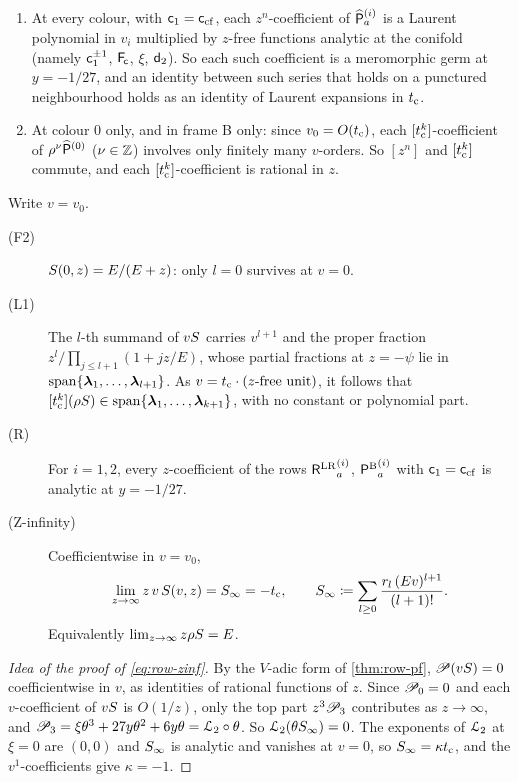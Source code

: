\begin{cor}
\label{cor:row-carry}
\begin{enumerate}
\item At every colour, with $\mathsf{c}_{1}=\mathsf{c}_{\mathrm{cf}}$, each $z^n$-coefficient of $\widehat{\mathsf{P}}_a^{(i)}$ is a Laurent polynomial in $v_i$ multiplied by $z$-free functions analytic at the conifold (namely $\mathsf{c}_{1}^{\pm1}$, $\mathsf{F}_{\!\mathsf{c}}$, $\xi$, $\mathsf{d}_{2}$). So each such coefficient is a meromorphic germ at $y=-1/27$, and an identity between such series that holds on a punctured neighbourhood holds as an identity of Laurent expansions in $t_{\mathrm{c}}$.
\item At colour $0$ only, and in frame B only: since $v_0=O(t_{\mathrm{c}})$, each $[t_{\mathrm{c}}^k]$-coefficient of $\rho^{\nu}\widehat{\mathsf{P}}^{(0)}$ ($\nu\in\mathbb{Z}$) involves only finitely many $v$-orders. So $[z^n]$ and $[t_{\mathrm{c}}^k]$ commute, and each $[t_{\mathrm{c}}^k]$-coefficient is rational in $z$.
\end{enumerate}
\end{cor}

\begin{cor}
\label{cor:row-closed}
Write $v=v_0$.
\begin{description}
\item[(F2)] $S(0,z)=E/(E+z)$: only $l=0$ survives at $v=0$.
\item[(L1)] The $l$-th summand of $vS$ carries $v^{l+1}$ and the proper fraction $z^l/\prod_{j\leq l+1}(1+jz/E)$, whose partial fractions at $z=-\psi$ lie in $\mathrm{span}\{\boldsymbol{\lambda}_1,\ldots,\boldsymbol{\lambda}_{l+1}\}$. As $v=t_{\mathrm{c}}\cdot(\text{$z$-free unit})$, it follows that $[t_{\mathrm{c}}^k](\rho S)\in\mathrm{span}\{\boldsymbol{\lambda}_1,\ldots,\boldsymbol{\lambda}_{k+1}\}$, with no constant or polynomial part.
\item[(R)] For $i=1,2$, every $z$-coefficient of the rows ${\mathsf{R}^{\mathrm{LR}}}_a^{(i)}$, ${\mathsf{P}^{\mathrm{B}}}_a^{(i)}$ with $\mathsf{c}_{1}=\mathsf{c}_{\mathrm{cf}}$ is analytic at $y=-1/27$.
\item[(Z-infinity)] Coefficientwise in $v=v_0$,
\begin{equation}
\label{eq:row-zinf}
\lim_{z\to\infty}z\,v\,S(v,z)=S_{\infty}=-t_{\mathrm{c}},\qquad S_{\infty}\coloneqq\sum_{l\geq0}\frac{r_l\,(Ev)^{l+1}}{(l+1)!}.
\end{equation}
Equivalently $\lim_{z\to\infty}z\rho S=E$.
\end{description}
\end{cor}

\begin{proof}[Idea of the proof of \eqref{eq:row-zinf}]
By the $V$-adic form of \cref{thm:row-pf}, $\mathscr{P}(vS)=0$ coefficientwise in $v$, as identities of rational functions of $z$. Since $\mathscr{P}_0=0$ and each $v$-coefficient of $vS$ is $O(1/z)$, only the top part $z^3\mathscr{P}_3$ contributes as $z\to\infty$, and $\mathscr{P}_3=\xi\theta^3+27y\theta^2+6y\theta=\mathcal{L}_{2}\circ\theta$. So $\mathcal{L}_{2}(\theta S_{\infty})=0$. The exponents of $\mathcal{L}_{2}$ at $\xi=0$ are $(0,0)$ and $S_{\infty}$ is analytic and vanishes at $v=0$, so $S_{\infty}=\kappa t_{\mathrm{c}}$, and the $v^1$-coefficients give $\kappa=-1$.
\end{proof}


